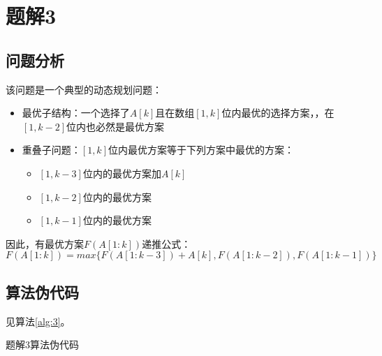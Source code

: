\section{题解3}
\subsection{问题分析}
该问题是一个典型的动态规划问题：
\begin{itemize}
    \item 最优子结构：一个选择了$A[k]$且在数组$[1,k]$位内最优的选择方案，，在$[1,k-2]$位内也必然是最优方案
    \item 重叠子问题：$[1,k]$位内最优方案等于下列方案中最优的方案：
    \begin{itemize}
        \item $[1,k-3]$位内的最优方案加$A[k]$
        \item $[1,k-2]$位内的最优方案
        \item $[1,k-1]$位内的最优方案
    \end{itemize}
\end{itemize}
因此，有最优方案$F(A[1:k])$递推公式：
$$F(A[1:k])=max\{F(A[1:k-3])+A[k],F(A[1:k-2]),F(A[1:k-1])\}$$

\subsection{算法伪代码}
见算法\ref{alg:3}。
\begin{algorithm}[htbp]
\caption{题解3算法伪代码}\label{alg:3}
\end{algorithm}